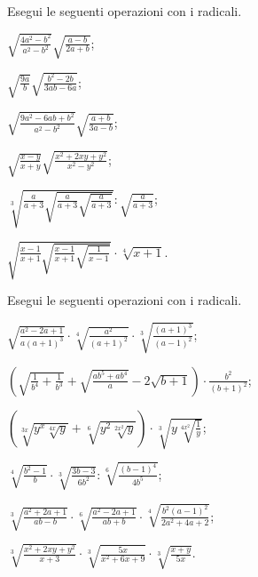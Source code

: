 \begin{esercizio}[\Ast]
 \label{ese:2.77}
Esegui le seguenti operazioni con i radicali.
 \begin{multicols}{2}
 \begin{enumeratea}
 \item $\sqrt{\frac{4a^2-b^2}{a^2-b^2}}\sqrt{\frac{a-b}{2a+b}}$;
 \item $\sqrt{\frac {9a}{b}}\sqrt{\frac{b^2-2b}{3ab-6a}}$;
 \item $\sqrt{\frac{9a^2-6ab+b^2}{a^2-b^2}}\sqrt{\frac{a+b}{3a-b}}$;
 \item $\sqrt{\frac{x-y}{x+y}}\sqrt{\frac{x^2+2xy+y^2}{x^2-y^2}}$;
 \item $\sqrt[3]{\frac a{a+3}\sqrt{\frac a{a+3}\sqrt{\frac a{a+3}}}}:\sqrt{\frac a{a+3}}$;
 \item $\sqrt{\frac{x-1}{x+1}\sqrt{\frac{x-1}{x+1}\sqrt{\frac 1{x-1}}}}\cdot \sqrt[4]{x+1}$.
 \end{enumeratea}
 \end{multicols}
\end{esercizio}
\pagebreak
\begin{esercizio}[\Ast]
 \label{ese:2.78}
Esegui le seguenti operazioni con i radicali.
 \begin{enumeratea}
 \item $\sqrt{\frac{a^2-2a+1}{a(a+1)^3}}\cdot \sqrt[4]{\frac{a^2}{(a+1)^2}}\cdot \sqrt[3]{\frac{(a+1)^3}{(a-1)^2}}$;
 \item $\left(\sqrt{\frac 1{b^4}+\frac 1{b^3}}+\sqrt{\frac{ab^5+ab^4} a}-2\sqrt{b+1}\right)\cdot \frac{b^2}{(b+1)^2}$;
 \item $\left(\sqrt[3x]{y^x\sqrt[4x]y}+\sqrt[6]{y^2\sqrt[2x^2]y}\right)\cdot \sqrt[3]{y\sqrt[4x^2]{\frac 1 y}}$;
 \item $\sqrt[4]{\frac{b^2-1} b}\cdot \sqrt[3]{\frac{3b-3}{6b^2}}:\sqrt[6]{\frac{(b-1)^4}{4b^5}}$;
 \item $\sqrt[3]{\frac{a^2+2a+1}{ab-b}}\cdot \sqrt[6]{\frac{a^2-2a+1}{ab+b}}\cdot \sqrt[4]{\frac{b^2(a-1)^2}{2a^2+4a+2}}$;
 \item $\sqrt[3]{\frac{x^2+2xy+y^2}{x+3}}\cdot \sqrt[3]{\frac{5x}{x^2+6x+9}}\cdot \sqrt[3]{\frac{x+y}{5x}}$.
 \end{enumeratea}
\end{esercizio}

